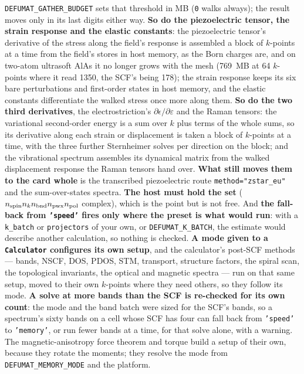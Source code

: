 \documentclass[11pt,a4paper]{article}
\newcommand{\code}[1]{\texttt{\small #1}}
\begin{document}
\begin{refuses}
\code{DEFUMAT\_GATHER\_BUDGET} sets that threshold in MB (\code{0} walks
always); the result moves only in its last digits either way. \textbf{So do the
piezoelectric tensor, the strain response and the elastic constants}: the
piezoelectric tensor's derivative of the stress along the field's response is
assembled a block of $k$-points at a time from the field's stores in host
memory, as the Born charges are, and on two-atom ultrasoft AlAs it no longer
grows with the mesh (769~MB at 64 $k$-points where it read 1350, the SCF's
being 178); the strain response keeps its six bare perturbations and
first-order states in host memory, and the elastic constants differentiate the
walked stress once more along them. \textbf{So do the two third derivatives},
the electrostriction's $\partial\epsilon/\partial\varepsilon$ and the Raman
tensors: the variational second-order energy is a sum over $k$ plus terms of the
whole sums, so its derivative along each strain or displacement is taken a
block of $k$-points at a time, with the three further Sternheimer solves per
direction on the block; and the vibrational spectrum assembles its dynamical
matrix from the walked displacement response the Raman tensors hand over.
\textbf{What still moves them to the card whole} is the transcribed
piezoelectric route \code{method="zstar\_eu"} and the sum-over-states spectra. \textbf{The host
must hold the set} ($n_{\rm spin} n_k n_{\rm bnd} n_{\rm pwx} n_{\rm pol}$
complex), which is the point but is not free. And \textbf{the fall-back from
\code{'speed'} fires only where the preset is what would run}: with a
\code{k\_batch} or \code{projectors} of your own, or \code{DEFUMAT\_K\_BATCH},
the estimate would describe another calculation, so nothing is checked.
\textbf{A mode given to a \code{Calculator} configures its own setup}, and the
calculator's post-SCF methods --- bands, NSCF, DOS, PDOS, STM, transport,
structure factors, the spiral scan, the topological invariants, the optical and
magnetic spectra --- run on that same setup, moved to their own $k$-points where
they need others, so they follow its mode. \textbf{A solve at more bands than the
SCF is re-checked for its own count}: the mode and the band batch were sized for
the SCF's bands, so a spectrum's sixty bands on a cell whose SCF has four can
fall back from \code{'speed'} to \code{'memory'}, or run fewer bands at a time,
for that solve alone, with a warning. The magnetic-anisotropy force theorem and torque build a setup of
their own, because they rotate the moments; they resolve the mode from
\code{DEFUMAT\_MEMORY\_MODE} and the platform.
\end{refuses}
\end{document}
